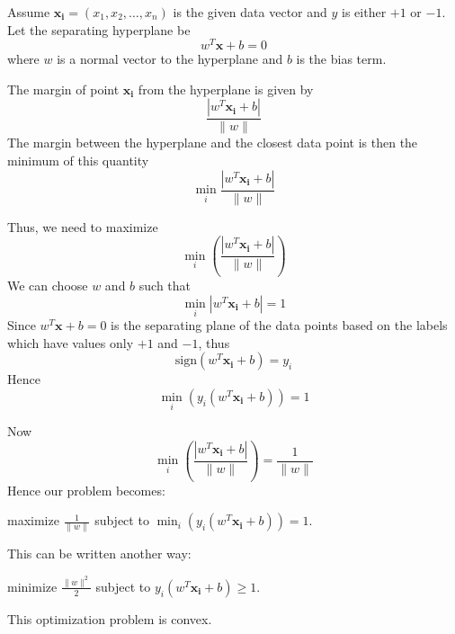 \documentclass{article}
\begin{document}
\begin{flushleft}
Assume $\mathbf{x_i} = (x_1, x_2, \ldots, x_n)$ is the given data vector and $y$ is either $+1$ or $-1$. Let the separating hyperplane be 
\begin{equation}
    w^T \mathbf{x} + b = 0
\end{equation}
where $w$ is a normal vector to the hyperplane and $b$ is the bias term.

The margin of point $\mathbf{x_i}$ from the hyperplane is given by
\begin{equation}
    \frac{|w^T \mathbf{x_i} + b|}{\|w\|}
\end{equation}
The margin between the hyperplane and the closest data point is then the minimum of this quantity
\begin{equation}
    \min_i \frac{|w^T \mathbf{x_i} + b|}{\|w\|}
\end{equation}

Thus, we need to maximize
\begin{equation}
    \min_i \left(\frac{|w^T \mathbf{x_i} + b|}{\|w\|}\right)
\end{equation}
We can choose $w$ and $b$ such that
\begin{equation}
    \min_i |w^T \mathbf{x_i} + b| = 1
\end{equation}
Since $w^T \mathbf{x} + b = 0$ is the separating plane of the data points based on the labels which have values only $+1$ and $-1$, thus
\begin{equation}
    \text{sign}(w^T \mathbf{x_i} + b) = y_i
\end{equation}
Hence
\begin{equation}
    \min_i \left(y_i(w^T \mathbf{x_i} + b)\right) = 1
\end{equation}

Now
\begin{equation}
    \min_i \left(\frac{|w^T \mathbf{x_i} + b|}{\|w\|}\right) = \frac{1}{\|w\|}
\end{equation}
Hence our problem becomes:
\begin{center}
    maximize $\frac{1}{\|w\|}$ subject to $\min_i \left(y_i(w^T \mathbf{x_i} + b)\right) = 1$.
\end{center}
This can be written another way:
\begin{center}
    minimize $\frac{\|w\|^2}{2}$ subject to $y_i(w^T \mathbf{x_i} + b) \geq 1$.
\end{center}

This optimization problem is convex.
\end{flushleft}
\end{document}
